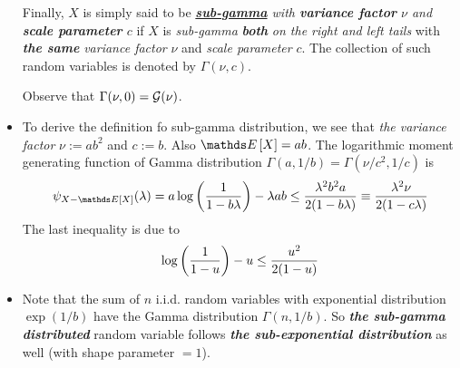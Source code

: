 \documentclass[11pt]{article}
\begin{document}
\begin{itemize}
\begin{definition}
Finally, $X$ is simply said to be \emph{\underline{\textbf{sub-gamma}} with \textbf{variance factor} $\nu$ and \textbf{scale parameter} $c$} if $X$ is \emph{sub-gamma} \emph{\textbf{both}} \emph{on the right and left tails} with \emph{\textbf{the same}} \emph{variance factor} $\nu$ and \emph{scale parameter} $c$. The collection of such random variables is denoted by  $\Gamma(\nu, c)$.

Observe that $\Gamma(\nu, 0)= {\mathcal G}(\nu)$.
\end{definition}

\item \begin{remark}
To derive the definition fo sub-gamma distribution, we see that \emph{the variance factor} $\nu:= ab^2$ and $c:= b$. Also $\E{}{X} = ab$. The logarithmic moment generating function of Gamma distribution $\Gamma(a, 1/b) = \Gamma(\nu/c^2, 1/c)$ is 
\begin{align*}
\psi_{X - \E{}{X}}(\lambda) = a\log\paren{\frac{1}{1 - b \lambda}} - \lambda a b  \le  \frac{\lambda^2 b^2 a}{2(1 - b\lambda)} \equiv  \frac{\lambda^2 \nu}{2(1 - c\lambda)}
\end{align*}
The last inequality is due to 
\begin{align*}
\log \left(\frac{1}{1 - u}\right) - u \le \frac{u^2}{2(1 - u)}
\end{align*}
\end{remark}

\item \begin{remark}
Note that the sum of $n$ i.i.d. random variables with exponential distribution $\exp(1/b)$ have the Gamma distribution $\Gamma(n, 1/b)$. So \emph{\textbf{the sub-gamma distributed}} random variable follows  \emph{\textbf{the sub-exponential distribution}} as well (with shape parameter $=1$).
\end{remark}


\end{itemize}
\end{document}
